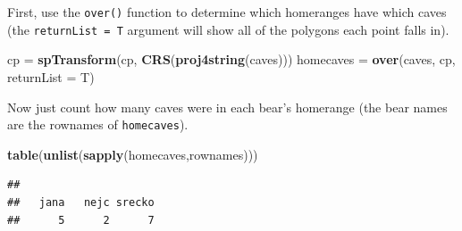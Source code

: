 \documentclass[]{book}
\newenvironment{Shaded}{\begin{snugshade}}{\end{snugshade}}
\newcommand{\KeywordTok}[1]{\textcolor[rgb]{0.13,0.29,0.53}{\textbf{#1}}}
\newcommand{\DataTypeTok}[1]{\textcolor[rgb]{0.13,0.29,0.53}{#1}}
\newcommand{\StringTok}[1]{\textcolor[rgb]{0.31,0.60,0.02}{#1}}
\newcommand{\NormalTok}[1]{#1}
\theoremstyle{definition}
\theoremstyle{definition}
\theoremstyle{definition}
\theoremstyle{remark}
\begin{document}
First, use the \texttt{over()} function to determine which homeranges
have which caves (the \texttt{returnList\ =\ T} argument will show all
of the polygons each point falls in).

\begin{Shaded}
\begin{Highlighting}[]
\NormalTok{cp =}\StringTok{ }\KeywordTok{spTransform}\NormalTok{(cp, }\KeywordTok{CRS}\NormalTok{(}\KeywordTok{proj4string}\NormalTok{(caves)))}
\NormalTok{homecaves =}\StringTok{ }\KeywordTok{over}\NormalTok{(caves, cp, }\DataTypeTok{returnList =}\NormalTok{ T)}
\end{Highlighting}
\end{Shaded}

Now just count how many caves were in each bear's homerange (the bear
names are the rownames of \texttt{homecaves}).

\begin{Shaded}
\begin{Highlighting}[]
\KeywordTok{table}\NormalTok{(}\KeywordTok{unlist}\NormalTok{(}\KeywordTok{sapply}\NormalTok{(homecaves,rownames)))}
\end{Highlighting}
\end{Shaded}

\begin{verbatim}
## 
##   jana   nejc srecko 
##      5      2      7
\end{verbatim}


\end{document}
